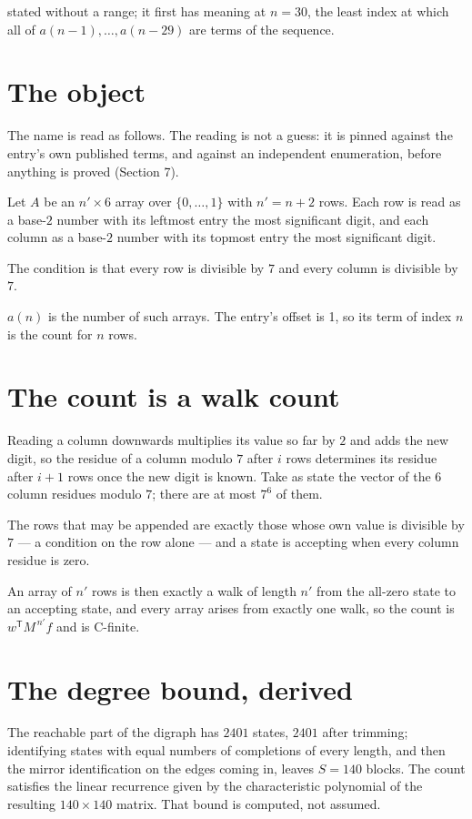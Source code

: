 \documentclass[11pt]{article}
\theoremstyle{definition}
\begin{document}
stated without a range; it first has meaning at $n = 30$, the least index at which all of $a(n-1),\dots,a(n-29)$ are terms of the sequence.

\section{The object}

The name is read as follows. The reading is not a guess: it is pinned against the entry's own published terms, and against an independent enumeration, before anything is proved (Section 7).

Let $A$ be an $n' \times 6$ array over $\{0,\dots,1\}$ with $n' = n + 2$ rows. Each row is read as a base-$2$ number with its leftmost entry the most significant digit, and each column as a base-$2$ number with its topmost entry the most significant digit.

The condition is that every row is divisible by $7$ and every column is divisible by $7$.

$a(n)$ is the number of such arrays. The entry's offset is 1, so its term of index $n$ is the count for $n$ rows.

\section{The count is a walk count}

Reading a column downwards multiplies its value so far by $2$ and adds the new digit, so the residue of a column modulo $7$ after $i$ rows determines its residue after $i+1$ rows once the new digit is known. Take as state the vector of the $6$ column residues modulo $7$; there are at most $7^{6}$ of them.

The rows that may be appended are exactly those whose own value is divisible by $7$ --- a condition on the row alone --- and a state is accepting when every column residue is zero.

An array of $n'$ rows is then exactly a walk of length $n'$ from the all-zero state to an accepting state, and every array arises from exactly one walk, so the count is $w^{\mathsf T}M^{\,n'}f$ and is C-finite.

\section{The degree bound, derived}

The reachable part of the digraph has $2401$ states, $2401$ after trimming; identifying states with equal numbers of completions of every length, and then the mirror identification on the edges coming in, leaves $S = 140$ blocks. The count satisfies the linear recurrence given by the characteristic polynomial of the resulting $140\times140$ matrix. That bound is computed, not assumed.
\end{document}
